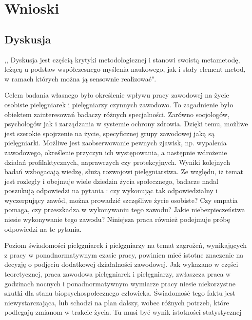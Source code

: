 \documentclass[a4paper,12pt,twoside,openany]{report}
\begin{document}
\chapter{Wnioski}


\section{Dyskusja}
,, Dyskusja jest częścią krytyki metodologicznej i stanowi swoistą metametodę, leżącą u podstaw współczesnego myślenia naukowego, jak i stały element metod, w ramach których można ją sensownie realizować"\cite{krytyka}.


Celem badania własnego było określenie wpływu pracy zawodowej na życie osobiste pielęgniarek i pielęgniarzy czynnych zawodowo. To zagadnienie było obiektem zainteresowań badaczy różnych specjalności. Zarówno socjologów, psychologów jak i zarządzania w systemie ochrony zdrowia.  Dzięki temu, możliwe jest szerokie spojrzenie na życie, specyficznej grupy zawodowej jaką są pielęgniarki. Możliwe jest zaobserwowanie pewnych zjawisk, np. wypalenia zawodowego, określenie przyczyn ich występowania, a następnie wdrożenie działań profilaktycznych, naprawczych czy protekcyjnych. Wyniki kolejnych badań wzbogacają wiedzę, służą rozwojowi pielęgniarstwa. Ze względu, iż temat jest rozległy i obejmuje wiele dziedzin życia społecznego, badacze nadal poszukują odpowiedzi na pytania : czy wykonując tak odpowiedzialny i wyczerpujący zawód, można prowadzić szczęśliwe życie osobiste? Czy empatia pomaga, czy przeszkadza w wykonywaniu tego zawodu? Jakie niebezpieczeństwa niesie wykonywanie tego zawodu? Niniejsza praca również podejmuje próbę odpowiedzi na te pytania.



Poziom świadomości pielęgniarek i pielęgniarzy na temat zagrożeń, wynikających z pracy w ponadnormatywnym czasie pracy, powinien mieć istotne znaczenie na decyzję o podjęciu dodatkowej działalności zawodowej. Jak wykazano w części teoretycznej, praca zawodowa pielęgniarek i pielęgniarzy, zwłaszcza praca w godzinach nocnych i ponadnormatywnym wymiarze pracy niesie niekorzystne skutki dla stanu biopsychospołecznego człowieka. Świadomość tego faktu jest niewystarczająca, lub schodzi na plan dalszy, wobec różnych potrzeb, które podlegają zmianom w trakcie życia. Tu musi być wynik istotności statystycznej
\end{document}
